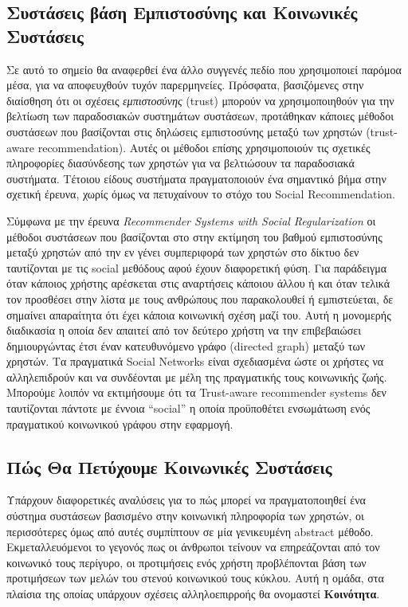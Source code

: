 \subsection{Συστάσεις βάση Εμπιστοσύνης και Κοινωνικές Συστάσεις} 
\noindent
Σε αυτό το σημείο θα αναφερθεί ένα άλλο συγγενές πεδίο που χρησιμοποιεί παρόμοα μέσα, για να αποφευχθούν τυχόν παρερμηνείες.
Πρόσφατα, βασιζόμενες στην διαίσθηση ότι οι σχέσεις \emph{εμπιστοσύνης} (trust) μπορούν να χρησιμοποιηθούν για την βελτίωση των παραδοσιακών συστημάτων συστάσεων,
προτάθηκαν κάποιες μέθοδοι συστάσεων που βασίζονται στις δηλώσεις εμπιστοσύνης μεταξύ των χρηστών (trust-aware recommendation). 
Αυτές οι μέθοδοι επίσης χρησιμοποιούν τις σχετικές πληροφορίες διασύνδεσης των χρηστών για να βελτιώσουν τα παραδοσιακά συστήματα. 
Τέτοιου είδους συστήματα πραγματοποιούν ένα σημαντικό βήμα στην σχετική έρευνα, χωρίς όμως να πετυχαίνουν 
το στόχο του Social Recommendation.

Σύμφωνα με την έρευνα \emph{Recommender Systems with Social Regularization} \cite{RSwithSreg} οι μέθοδοι συστάσεων
που βασίζονται στο στην εκτίμηση του βαθμού εμπιστοσύνης μεταξύ χρηστών  από την εν γένει συμπεριφορά των χρηστών στο δίκτυο δεν ταυτίζονται με τις social μεθόδους αφού έχουν διαφορετική φύση.
Για παράδειγμα όταν κάποιος χρήστης αρέσκεται στις αναρτήσεις κάποιου άλλου ή και όταν τελικά τον προσθέσει στην λίστα με τους ανθρώπους που παρακολουθεί ή εμπιστεύεται,
δε σημαίνει απαραίτητα ότι έχει κάποια κοινωνική σχέση μαζί του.
Αυτή η μονομερής διαδικασία η οποία δεν απαιτεί από τον δεύτερο χρήστη να την επιβεβαιώσει δημιουργώντας έτσι έναν κατευθυνόμενο γράφο (directed graph) μεταξύ των χρηστών.
Τα πραγματικά Social Networks είναι σχεδιασμένα ώστε οι χρήστες να αλληλεπιδρούν και να συνδέονται με μέλη της πραγματικής τους κοινωνικής ζωής.
Μπορούμε λοιπόν να εκτιμήσουμε ότι τα Trust-aware recommender systems δεν ταυτίζονται πάντοτε με έννοια “social” η οποία προϋποθέτει ενσωμάτωση ενός πραγματικού κοινωνικού γράφου στην εφαρμογή.

\subsection{Πώς Θα Πετύχουμε Κοινωνικές Συστάσεις}
\noindent
Υπάρχουν διαφορετικές αναλύσεις για το πώς μπορεί να πραγματοποιηθεί ένα σύστημα συστάσεων βασισμένο στην κοινωνική πληροφορία των χρηστών,
οι περισσότερες όμως από αυτές συμπίπτουν σε μία γενικευμένη abstract μέθοδο.
Εκμεταλλευόμενοι το γεγονός πως οι άνθρωποι τείνουν να επηρεάζονται από τον κοινωνικό τους περίγυρο, οι προτιμήσεις ενός χρήστη προβλέπονται βάση των προτιμήσεων των μελών του 
στενού κοινωνικού τους κύκλου. Αυτή η ομάδα, στα πλαίσια της οποίας υπάρχουν σχέσεις αλληλοεπιρροής θα ονομαστεί \textbf{Κοινότητα}.

